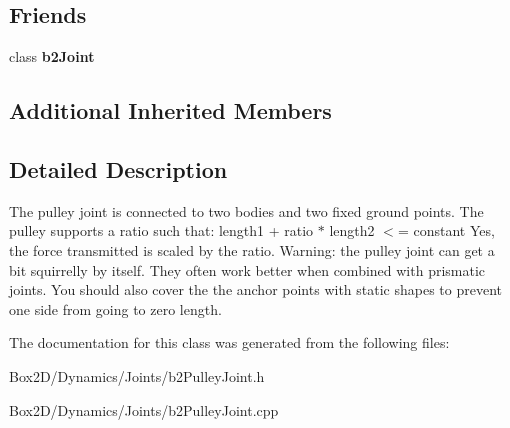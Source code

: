 \subsection*{Friends}
\begin{DoxyCompactItemize}
\item 
\mbox{\label{classb2_pulley_joint_a54ade8ed3d794298108d7f4c4e4793fa}} 
class {\bfseries b2\+Joint}
\end{DoxyCompactItemize}
\subsection*{Additional Inherited Members}


\subsection{Detailed Description}
The pulley joint is connected to two bodies and two fixed ground points. The pulley supports a ratio such that\+: length1 + ratio $\ast$ length2 $<$= constant Yes, the force transmitted is scaled by the ratio. Warning\+: the pulley joint can get a bit squirrelly by itself. They often work better when combined with prismatic joints. You should also cover the the anchor points with static shapes to prevent one side from going to zero length. 

The documentation for this class was generated from the following files\+:\begin{DoxyCompactItemize}
\item 
Box2\+D/\+Dynamics/\+Joints/b2\+Pulley\+Joint.\+h\item 
Box2\+D/\+Dynamics/\+Joints/b2\+Pulley\+Joint.\+cpp\end{DoxyCompactItemize}
